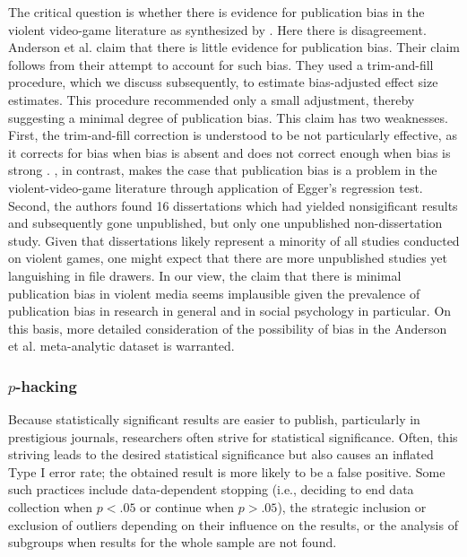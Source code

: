 \documentclass[man]{apa6}
\begin{document}
The critical question is whether there is evidence for publication bias in the violent video-game literature as synthesized by \citet{Anderson:etal:2010}.  Here there is disagreement.  Anderson et al. claim that there is little evidence for publication bias.  Their claim follows from their attempt to account for such bias.  They used a  trim-and-fill procedure, which we discuss subsequently, to estimate bias-adjusted effect size estimates. This procedure recommended only a small adjustment, thereby suggesting a minimal degree of publication bias. This claim has two weaknesses.  First, the trim-and-fill correction is understood to be not particularly effective, as it corrects for bias when bias is absent and does not correct enough when bias is strong \citep{Simonsohn:etal:2014b}. \citet{Ferguson:2007}, in contrast, makes the case that publication bias is a problem in the violent-video-game literature through application of Egger's regression test. Second, the authors found 16 dissertations which had yielded nonsigificant results and subsequently gone unpublished, but only one unpublished non-dissertation study. Given that dissertations likely represent a minority of all studies conducted on violent games, one might expect that there are more unpublished studies yet languishing in file drawers. In our view, the claim that there is minimal publication bias in violent media seems implausible given the prevalence of publication bias in research in general and in social psychology in particular.  On this basis, more detailed consideration of the possibility of bias in the Anderson et al. meta-analytic dataset is warranted.

\subsubsection{$p$-hacking}
Because statistically significant results are easier to publish, particularly in prestigious journals, researchers often strive for statistical significance. Often, this striving leads to the desired statistical significance but also causes an inflated Type I error rate; the obtained result is more likely to be a false positive. Some such practices include data-dependent stopping (i.e., deciding to end data collection when $p < .05$ or continue when $p > .05$), the strategic inclusion or exclusion of outliers depending on their influence on the results, or the analysis of subgroups when results for the whole sample are not found.
\end{document}
